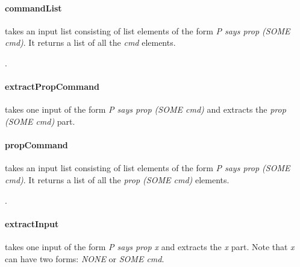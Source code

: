 \documentclass[../../main/main.tex]{subfiles}
\begin{document}
\HOLssmTheoremsextractCommandXXdef


\paragraph*{commandList}
 takes an input list consisting of list elements of the form \textit{P says prop (SOME cmd)}.  It returns a list of all the \textit{cmd} elements.
\begin{tabbing}
\parskip=8pt
\HOLTokenTurnstile{} \HOLSymConst{\HOLTokenForall{}}. \\
\hspace{0.3cm}   \HOLSymConst{=}   
\parskip=18pt
\end{tabbing}

\paragraph*{extractPropCommand}
 takes one input of the form \textit{P says prop (SOME cmd)} and extracts the \textit{prop (SOME cmd)} part.

\HOLssmTheoremsextractPropCommandXXdef


\paragraph*{propCommand}
 takes an input list consisting of list elements of the form \textit{P says prop (SOME cmd)}.  It returns a list of all the \textit{prop (SOME cmd)} elements.
\begin{tabbing}
\parskip=8pt
\HOLTokenTurnstile{} \HOLSymConst{\HOLTokenForall{}}. \\
\hspace{0.3cm}   \HOLSymConst{=}   
\parskip=18pt
\end{tabbing}


\paragraph*{extractInput}
 takes one input of the form \textit{P says prop x} and extracts the \textit{x} part. Note that \textit{x} can have two forms: \textit{NONE} or \textit{SOME cmd}.

\HOLssmTheoremsextractInputXXdef
\end{document}
